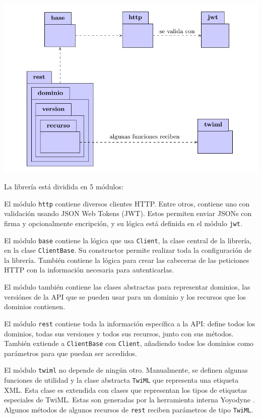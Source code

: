 \documentclass{article}
\begin{document}
\includegraphics{vista_desarrollo.pdf}

La librería está dividida en 5 módulos:

\hfill

El módulo \verb|http| contiene diversos clientes HTTP.
Entre otros,
contiene uno con validación usando JSON Web Tokens (JWT).
Estos permiten enviar JSONs con firma y opcionalmente encripción,
y su lógica está definida en el módulo \verb|jwt|.

\hfill

El módulo \verb|base| contiene
la lógica que usa \verb|Client|,
la clase central de la librería,
en la clase \verb|ClientBase|.
Su constructor permite realizar
toda la configuración de la librería.
También contiene la lógica para 
crear las cabeceras de las peticiones HTTP
con la información necesaria para autenticarlas.

El módulo también contiene las clases abstractas
para representar dominios,
las versiónes de la API que se pueden usar para un dominio
y los recursos que los dominios contienen.

\hfill

El módulo \verb|rest|
contiene toda la información específica a la API:
define todos los dominios,
todas sus versiones y todos sus recursos,
junto con sus métodos.
También extiende a \verb|ClientBase| con \verb|Client|,
añadiendo todos los dominios como parámetros
para que puedan ser accedidos.

\hfill

El módulo \verb|twiml| no depende de ningún otro.
Manualmente, se definen algunas funciones de utilidad
y la clase abstracta \verb|TwiML|
que representa una etiqueta XML.
Esta clase es extendida
con clases que representan los tipos de etiquetas especiales de TwiML.
Estas son generadas por la herramienta interna Yoyodyne
\cite{twilio-generated-yoyodyne}.
Algunos métodos de algunos recursos de \verb|rest|
reciben parámetros de tipo \verb|TwiML|.
\end{document}
